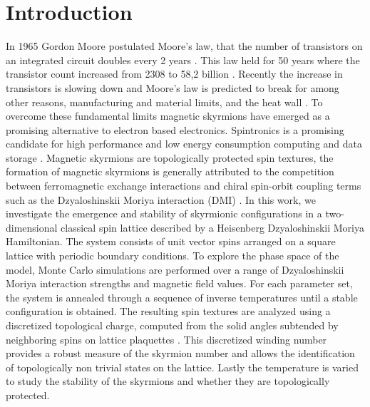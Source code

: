 \section{Introduction }
In 1965 Gordon Moore postulated Moore's law, that the number of transistors on an integrated circuit doubles every 2 years \cite{4785860}. 
This law held for 50 years where the transistor count increased from 2308 to 58,2 billion \cite{owid-moores-law}. 
Recently the increase in transistors is slowing down and Moore's law is predicted to break for among other reasons, manufacturing and material limits, and the heat wall \cite{Markov_2014}.
To overcome these fundamental limits magnetic skyrmions have emerged as a promising alternative to electron based electronics. 
Spintronics is a promising candidate for high performance and low energy consumption computing and data storage \cite{Zhang_2023}. 
Magnetic skyrmions are topologically protected spin textures, the formation of magnetic skyrmions is generally attributed to the competition between ferromagnetic exchange interactions and chiral spin-orbit coupling terms such as the Dzyaloshinskii Moriya interaction (DMI) \cite{Dzyaloshinsky1958ATT} \cite{PhysRev.120.91}. 
In this work, we investigate the emergence and stability of skyrmionic configurations in a two-dimensional classical spin lattice described by a Heisenberg Dzyaloshinskii Moriya Hamiltonian. 
The system consists of unit vector spins arranged on a square lattice with periodic boundary conditions. 
To explore the phase space of the model, Monte Carlo simulations are performed over a range of Dzyaloshinskii Moriya interaction strengths and magnetic field values. 
For each parameter set, the system is annealed through a sequence of inverse temperatures until a stable configuration is obtained. 
The resulting spin textures are analyzed using a discretized topological charge, computed from the solid angles subtended by neighboring spins on lattice plaquettes \cite{BERG1981412}. This discretized winding number provides a robust measure of the skyrmion number and allows the identification of topologically non trivial states on the lattice.
Lastly the temperature is varied to study the stability of the skyrmions and whether they are topologically protected.
